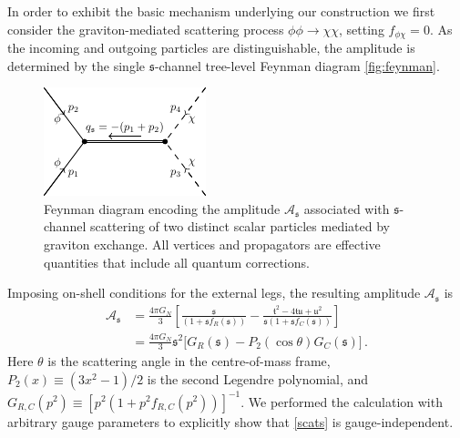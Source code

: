 \documentclass[aps,prl,reprint,twocolumn,superscriptaddress,longbibliography,nofootinbib,floatfix,showpacs]{revtex4-1}
\newcommand{\cA}{{\mathcal A}}
\newcommand{\mans}{\ensuremath{\mathfrak{s}}}
\newcommand{\mant}{\ensuremath{\mathfrak{t}}}
\newcommand{\manu}{\ensuremath{\mathfrak{u}}}
\begin{document}
In order to exhibit the basic mechanism underlying our construction we first consider the graviton-mediated scattering process $\phi\phi \to \chi\chi$, setting $f_{\phi\chi} = 0$.
As the incoming and outgoing particles are distinguishable, the amplitude is determined by the single $\mans$-channel tree-level Feynman diagram \autoref{fig:feynman}.
%
\begin{figure}
	\includegraphics[width=0.5\columnwidth]{s_channel_two_fields_with_field_labels}
	\caption{Feynman diagram encoding the amplitude $\mathcal{A}_\mans$ associated with $\mans$-channel scattering of two distinct scalar particles mediated by graviton exchange. All vertices and propagators are effective quantities that include all quantum corrections.}
	\label{fig:feynman}
\end{figure}
%
Imposing on-shell conditions for the external legs, the resulting amplitude $\cA_\mans$ is
%
\begin{equation}\label{scats}
\begin{aligned}
\mathcal{A}_\mans & = 
\frac{4\pi G_N}{3}	\left[
\frac{\mans}{(1+ \mans f_R(\mans))} - \frac{\mant^2-4 \mant \manu + \manu^2}{\mans (1+\mans f_C(\mans))}
\right]
\\ 
& =
\frac{4\pi G_N}{3} \mans^2	\bigg[
 G_R(\mans) -	P_2(\cos\theta) G_C(\mans)
\bigg] \, .
\end{aligned}
\end{equation}
%
Here $\theta$ is the scattering angle in the centre-of-mass frame, $P_2(x) \equiv (3x^2-1)/2$ is the second Legendre polynomial, and $G_{R,C}(p^2) \equiv [p^2 (1+p^2 f_{R,C}(p^2))]^{-1}$.
We performed the  calculation with arbitrary gauge parameters to explicitly show that \eqref{scats} is gauge-independent.
\end{document}
